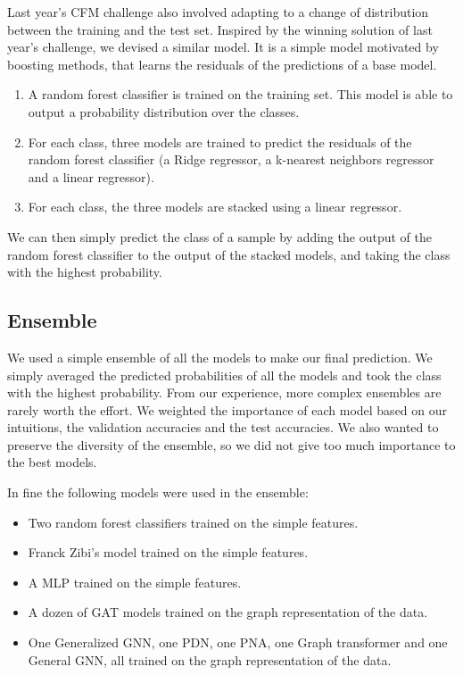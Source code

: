 \documentclass[switch, 11pt]{article}
\begin{document}
\begin{multicols}{2}
    Last year's CFM challenge also involved adapting to a change of distribution between the training and the test set. Inspired by the winning solution of last year's challenge, we devised a similar model. It is a simple model motivated by boosting methods, that learns the residuals of the predictions of a base model.
    \begin{enumerate}
        \item A random forest classifier is trained on the training set. This model is able to output a probability distribution over the classes.
        \item For each class, three models are trained to predict the residuals of the random forest classifier (a Ridge regressor, a k-nearest neighbors regressor and a linear regressor).
        \item For each class, the three models are stacked using a linear regressor.
    \end{enumerate}

    We can then simply predict the class of a sample by adding the output of the random forest classifier to the output of the stacked models, and taking the class with the highest probability.

    \subsection{Ensemble}

    We used a simple ensemble of all the models to make our final prediction. We simply averaged the predicted probabilities of all the models and took the class with the highest probability. From our experience, more complex ensembles are rarely worth the effort. We weighted the importance of each model based on our intuitions, the validation accuracies and the test accuracies. We also wanted to preserve the diversity of the ensemble, so we did not give too much importance to the best models.

    In fine the following models were used in the ensemble:
    \begin{itemize}
        \item Two random forest classifiers trained on the simple features.
        \item Franck Zibi's model trained on the simple features.
        \item A MLP trained on the simple features.
        \item A dozen of GAT models trained on the graph representation of the data.
        \item One Generalized GNN, one PDN, one PNA, one Graph transformer and one General GNN, all trained on the graph representation of the data.
    \end{itemize}


\end{multicols}
\end{document}
